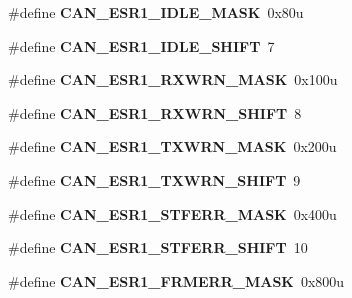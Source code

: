 \begin{DoxyCompactItemize}
\item 
\#define {\bfseries C\+A\+N\+\_\+\+E\+S\+R1\+\_\+\+I\+D\+L\+E\+\_\+\+M\+A\+SK}~0x80u\hypertarget{group__CAN__Register__Masks_ga68402932c750edd9ad719585c3be03d2}{}\label{group__CAN__Register__Masks_ga68402932c750edd9ad719585c3be03d2}

\item 
\#define {\bfseries C\+A\+N\+\_\+\+E\+S\+R1\+\_\+\+I\+D\+L\+E\+\_\+\+S\+H\+I\+FT}~7\hypertarget{group__CAN__Register__Masks_ga1eccf60cd0f2bf9a3a426f1ff05f8869}{}\label{group__CAN__Register__Masks_ga1eccf60cd0f2bf9a3a426f1ff05f8869}

\item 
\#define {\bfseries C\+A\+N\+\_\+\+E\+S\+R1\+\_\+\+R\+X\+W\+R\+N\+\_\+\+M\+A\+SK}~0x100u\hypertarget{group__CAN__Register__Masks_ga805a12fba10c76a26fddedeb8634bbe6}{}\label{group__CAN__Register__Masks_ga805a12fba10c76a26fddedeb8634bbe6}

\item 
\#define {\bfseries C\+A\+N\+\_\+\+E\+S\+R1\+\_\+\+R\+X\+W\+R\+N\+\_\+\+S\+H\+I\+FT}~8\hypertarget{group__CAN__Register__Masks_ga879a6ef8506f66a73cfc185d6814ee4e}{}\label{group__CAN__Register__Masks_ga879a6ef8506f66a73cfc185d6814ee4e}

\item 
\#define {\bfseries C\+A\+N\+\_\+\+E\+S\+R1\+\_\+\+T\+X\+W\+R\+N\+\_\+\+M\+A\+SK}~0x200u\hypertarget{group__CAN__Register__Masks_ga62d716c6701375e3106853152e62a312}{}\label{group__CAN__Register__Masks_ga62d716c6701375e3106853152e62a312}

\item 
\#define {\bfseries C\+A\+N\+\_\+\+E\+S\+R1\+\_\+\+T\+X\+W\+R\+N\+\_\+\+S\+H\+I\+FT}~9\hypertarget{group__CAN__Register__Masks_ga62114b41b2b2c5fb95cedde48d06d361}{}\label{group__CAN__Register__Masks_ga62114b41b2b2c5fb95cedde48d06d361}

\item 
\#define {\bfseries C\+A\+N\+\_\+\+E\+S\+R1\+\_\+\+S\+T\+F\+E\+R\+R\+\_\+\+M\+A\+SK}~0x400u\hypertarget{group__CAN__Register__Masks_ga8af394ab6bb4356bc5fa71e2278332ad}{}\label{group__CAN__Register__Masks_ga8af394ab6bb4356bc5fa71e2278332ad}

\item 
\#define {\bfseries C\+A\+N\+\_\+\+E\+S\+R1\+\_\+\+S\+T\+F\+E\+R\+R\+\_\+\+S\+H\+I\+FT}~10\hypertarget{group__CAN__Register__Masks_ga5f22b1b4cc45dbd63a5adb638b7c61a2}{}\label{group__CAN__Register__Masks_ga5f22b1b4cc45dbd63a5adb638b7c61a2}

\item 
\#define {\bfseries C\+A\+N\+\_\+\+E\+S\+R1\+\_\+\+F\+R\+M\+E\+R\+R\+\_\+\+M\+A\+SK}~0x800u\hypertarget{group__CAN__Register__Masks_ga85fea1af50a657cc862d71d166949cbd}{}\label{group__CAN__Register__Masks_ga85fea1af50a657cc862d71d166949cbd}


\end{DoxyCompactItemize}
